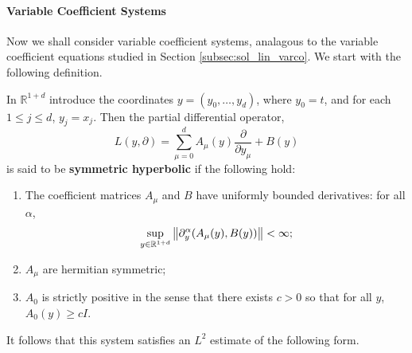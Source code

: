 \documentclass{article}
\begin{document}
\paragraph{Variable Coefficient Systems} Now we shall consider variable coefficient systems, analagous to the variable coefficient equations studied in Section \ref{subsec:sol_lin_varco}. We start with the following definition. 

\begin{definition}
	In $\mathbb{R}^{1 + d}$ introduce the coordinates $y = (y_{0}, \ldots, y_{d})$, where $y_{0} = t$, and for each $1 \leq j \leq d$, $y_{j} = x_{j}$. Then the partial differential operator, 
	\begin{equation}
		L(y,\partial) = \sum_{\mu = 0}^{d}A_{\mu}(y)\frac{\partial}{\partial y_{\mu}} + B(y) 
		\label{eq:symHypOp}
	\end{equation}
	is said to be \textbf{symmetric hyperbolic} if the following hold: \vspace{-0.2cm} 
	\begin{enumerate}[itemsep = -2pt]
		\item The coefficient matrices $A_{\mu}$ and $B$ have uniformly bounded derivatives: for all $\alpha$, 
		\begin{equation*}
			\sup_{y \in \mathbb{R}^{1 + d}}\left\Vert \partial^{\alpha}_{y}(A_{\mu}(y), B(y)) \right\Vert < \infty; 
		\end{equation*} 
		\item $A_{\mu}$ are hermitian symmetric; 
		\item $A_{0}$ is strictly positive in the sense that there exists $c > 0$ so that for all $y$, $A_{0}(y) \geq cI$. 
	\end{enumerate}
\end{definition} 

It follows that this system satisfies an $L^{2}$ estimate of the following form. 
\end{document}
